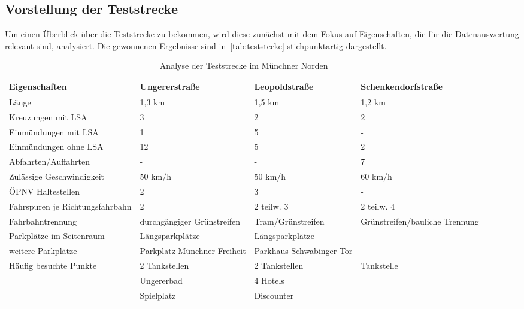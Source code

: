 \subsection{Vorstellung der Teststrecke}\label{subsechtion:Vorstellung der Teststrecke}
Um einen Überblick über die Teststrecke zu bekommen, wird diese zunächst mit dem Fokus auf Eigenschaften, die für die Datenauswertung relevant sind, analysiert. Die gewonnenen Ergebnisse sind in~\autoref{tab:teststecke} stichpunktartig dargestellt. 

\begin{table}[htpb]
	\scriptsize
	\caption[Analyse der Teststrecke im Münchner Norden]{Analyse der Teststrecke im Münchner Norden}\label{tab:teststecke}
	\centering
	\begin{tabular}{l p{3cm} p{3cm} p{3cm}}
		\toprule
		Eigenschaften & Ungererstraße & Leopoldstraße & Schenkendorfstraße \\
		\midrule
		Länge & 1,3 km & 1,5 km & 1,2 km \\
		Kreuzungen mit LSA & 3 & 2 & 2 \\
		Einmündungen mit LSA & 1 & 5 & - \\
		Einmündungen ohne LSA & 12 & 5 & 2 \\
		Abfahrten/Auffahrten & - & - & 7 \\
		Zulässige Geschwindigkeit & 50 km/h & 50 km/h & 60 km/h \\%
		ÖPNV Haltestellen & 2 & 3 & - \\
		Fahrspuren je Richtungsfahrbahn & 2 & 2 teilw. 3 & 2 teilw. 4 \\
		Fahrbahntrennung & durchgängiger Grünstreifen & Tram/Grünstreifen & Grünstreifen/bauliche Trennung\\
		Parkplätze im Seitenraum & Längsparkplätze & Längsparkplätze & - \\
		weitere Parkplätze & Parkplatz Münchner Freiheit & Parkhaus Schwabinger Tor & - \\
		Häufig besuchte Punkte & 2 Tankstellen & 2 Tankstellen & Tankstelle\\
		& Ungererbad & 4 Hotels & \\
		& Spielplatz & Discounter & \\
		\bottomrule
	\end{tabular}
\end{table}

